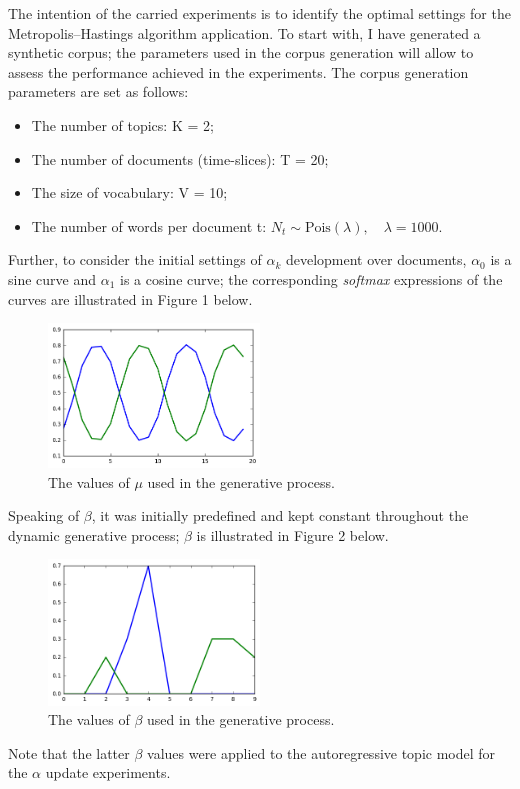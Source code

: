 \documentclass[12pt]{article}
\begin{document}
\par The intention of the carried experiments is to identify the optimal settings for the Metropolis--Hastings algorithm application. 
To start with, I have generated a synthetic corpus; the parameters used in the corpus generation will allow to assess the performance achieved in the experiments. The corpus generation parameters are set as follows:
\begin{itemize}
	\item The number of topics: K = 2;
	\item The number of documents (time-slices): T = 20;
	\item The size of vocabulary: V = 10;
	\item The number of words per document t: $N_t \sim \mbox{Pois}(\lambda),\quad \lambda = 1000$.
\end{itemize}
Further, to consider the initial settings of $\alpha_k$ development over documents, $\alpha_0$ is a sine curve and $\alpha_1$ is a cosine curve; the corresponding \textit{softmax} expressions of the curves are illustrated in Figure 1 below.
\begin{figure}[H]
  \centering
  \includegraphics[width=0.5\textwidth]{alpha_initial}
  \caption{The values of $\mu$ used in the generative process.}
  \label{fig:mu}
\end{figure}
Speaking of $\beta$, it was initially predefined and kept constant throughout the dynamic generative process; $\beta$ is illustrated in Figure 2 below.
\begin{figure}[H]
  \centering
  \includegraphics[width=0.5\textwidth]{beta_initial}
  \caption{The values of $\beta$ used in the generative process.}
  \label{fig:beta}
\end{figure}
Note that the latter $\beta$ values were applied to the autoregressive topic model for the $\alpha$ update experiments.
\end{document}
